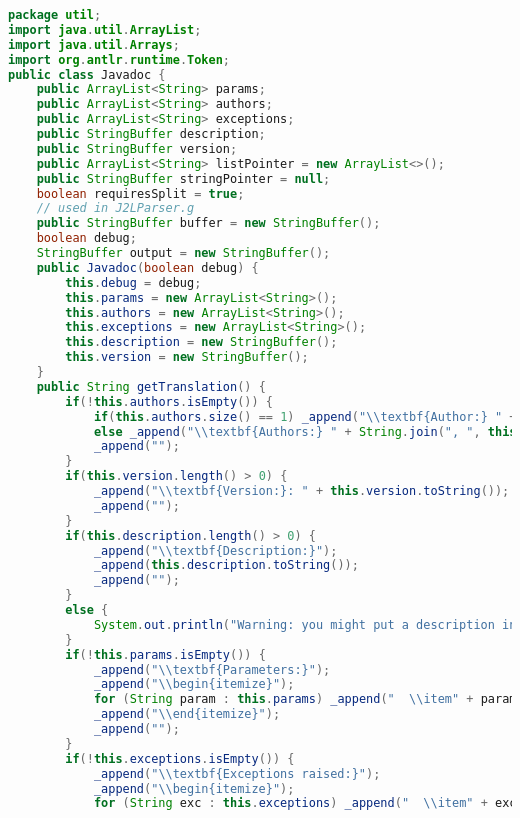 \begin{lstlisting}[language=Java]
package util;
import java.util.ArrayList;
import java.util.Arrays;
import org.antlr.runtime.Token;
public class Javadoc {
    public ArrayList<String> params;
    public ArrayList<String> authors;
    public ArrayList<String> exceptions;
    public StringBuffer description;
    public StringBuffer version;
    public ArrayList<String> listPointer = new ArrayList<>();
    public StringBuffer stringPointer = null;
    boolean requiresSplit = true;
    // used in J2LParser.g
    public StringBuffer buffer = new StringBuffer();
    boolean debug;
    StringBuffer output = new StringBuffer();
    public Javadoc(boolean debug) {
        this.debug = debug;
        this.params = new ArrayList<String>();
        this.authors = new ArrayList<String>();
        this.exceptions = new ArrayList<String>();
        this.description = new StringBuffer();
        this.version = new StringBuffer();
    }
    public String getTranslation() {
        if(!this.authors.isEmpty()) {
            if(this.authors.size() == 1) _append("\\textbf{Author:} " + this.authors.get(0));
            else _append("\\textbf{Authors:} " + String.join(", ", this.authors));
            _append("");
        }
        if(this.version.length() > 0) {
            _append("\\textbf{Version:}: " + this.version.toString());
            _append("");
        }
        if(this.description.length() > 0) {
            _append("\\textbf{Description:}");
            _append(this.description.toString());
            _append("");
        }
        else {
            System.out.println("Warning: you might put a description in your javadoc sections.");
        }
        if(!this.params.isEmpty()) {
            _append("\\textbf{Parameters:}");
            _append("\\begin{itemize}");
            for (String param : this.params) _append("  \\item" + param);
            _append("\\end{itemize}");
            _append("");
        }
        if(!this.exceptions.isEmpty()) {
            _append("\\textbf{Exceptions raised:}");
            _append("\\begin{itemize}");
            for (String exc : this.exceptions) _append("  \\item" + exc);

\end{lstlisting}
